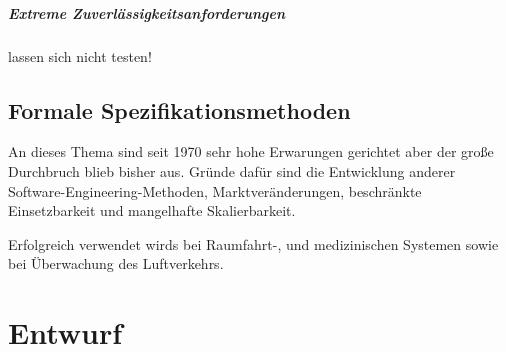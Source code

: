 
\paragraph{Extreme Zuverlässigkeitsanforderungen} lassen sich nicht testen!

\section{Formale Spezifikationsmethoden}
An dieses Thema sind seit 1970 sehr hohe Erwarungen gerichtet aber der große Durchbruch blieb bisher aus. Gründe dafür sind die Entwicklung anderer Software-Engineering-Methoden, Marktveränderungen, beschränkte Einsetzbarkeit und mangelhafte Skalierbarkeit. 

Erfolgreich verwendet wirds bei Raumfahrt-, und medizinischen Systemen sowie bei Überwachung des Luftverkehrs. 



\chapter{Entwurf}













